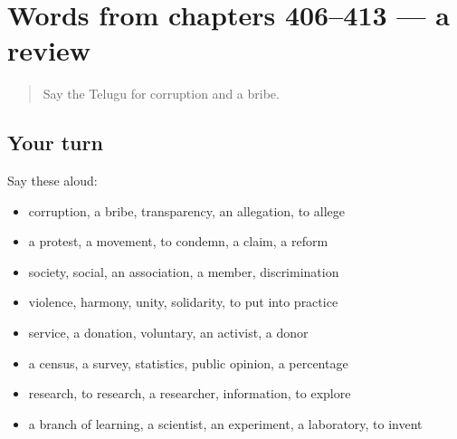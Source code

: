 \section[(dialogue)]{Words from chapters 406–413 — a review}

\label{lesson:TE-R413-review-406-413}



\begin{quote}
Say the Telugu for corruption and a bribe.
\end{quote}

\subsection*{Your turn}
Say these aloud:

\begin{itemize}
\raggedright
  \item corruption, a bribe, transparency, an allegation, to allege
  \item a protest, a movement, to condemn, a claim, a reform
  \item society, social, an association, a member, discrimination
  \item violence, harmony, unity, solidarity, to put into practice
  \item service, a donation, voluntary, an activist, a donor
  \item a census, a survey, statistics, public opinion, a percentage
  \item research, to research, a researcher, information, to explore
  \item a branch of learning, a scientist, an experiment, a laboratory, to invent
\end{itemize}

